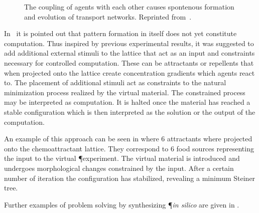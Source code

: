			\begin{figure}
				\centering
				
				
				\caption[Multi-agent \P - Evolution of agents]{The coupling of agents with each other causes spontenous formation and evolution of transport networks. Reprinted from~\cite{jones2016multi}.}
				\label{fig:agent_evolution}
			\end{figure}

			In~\cite{jones2016multi} it is pointed out that pattern formation in itself does not yet constitute computation. Thus inspired by previous experimental results, it was suggested to add additional external stimuli to the lattice that act as an input and constraints necessary for controlled computation. These can be attractants or repellents that when projected onto the lattice create concentration gradients which agents react to. The placement of additional stimuli act as constraints to the natural minimization process realized by the virtual material. The constrained process may be interpreted as computation. It is halted once the material has reached a stable configuration which is then interpreted as the solution or the output of the computation.

			An example of this approach can be seen in  where $6$ attractants where projected onto the chemoattractant lattice. They correspond to $6$ food sources representing the input to the virtual \P experiment. The virtual material is introduced and undergoes morphological changes constrained by the input. After a certain number of iteration the configuration has stabilized, revealing a minimum Steiner tree.

			Further examples of problem solving by synthesizing \P \textit{in silico} are given in .

